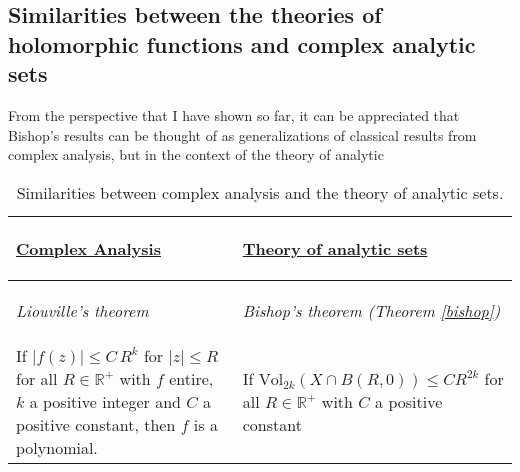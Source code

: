 \documentclass[12pt,twoside,a4paper]{report}
\newcommand{\re}{\ensuremath{\mathbb R }}
\begin{document}
\subsection{Similarities between the theories of holomorphic functions and complex analytic sets}

\noindent From the perspective that I have shown so far, it can be appreciated that Bishop's results can be thought of as generalizations of classical results from complex analysis, but in the context of the theory of analytic

\begin{table}[h!]
        \caption{Similarities between complex analysis and the theory of analytic sets.}\label{table_complex_analysis}
        \centering
        \begin{tabular}{| m{5cm} | m{5cm} |}
                            \toprule
                            \begin{center} %
                                    \underline{\textbf{Complex Analysis}}
                            \end{center} &
                            \begin{center} %
                                    \underline{\textbf{Theory of analytic sets}}
                            \end{center} \\
                            \midrule
                            \begin{center}
                                    \textit{Liouville's theorem}
                            \end{center} &
                            \begin{center}
                                    \textit{Bishop's theorem (Theorem \ref{bishop})}
                            \end{center}\\
                            \midrule
                                If $\vert f(z)\vert\leq C\,R^k$ for $\vert z\vert\leq R$ for all $R\in\re^{+}$ with $f$
                                entire, $k$ a positive integer and $C$ a positive constant, then $f$ is a polynomial.
                                         &
                                If $\textrm{Vol}_{2k}(X\cap B(R,0))\leq CR^{2k}$ for all $R\in\re^{+}$ with $C$ a positive constant

\end{tabular}
\end{table}
\end{document}
